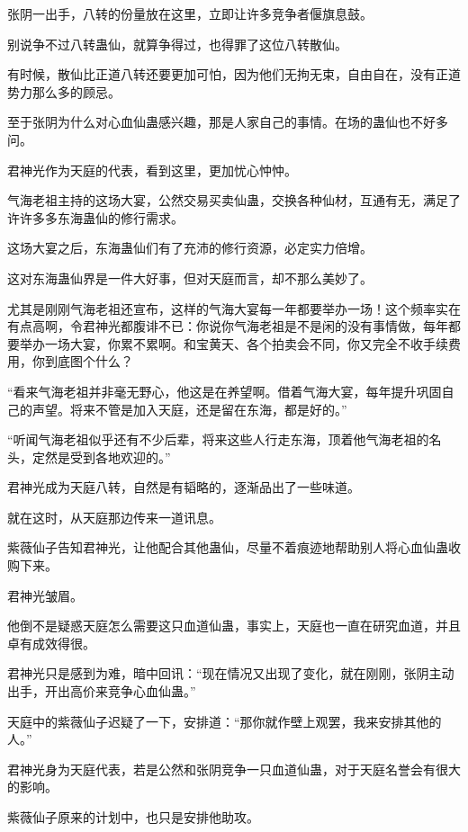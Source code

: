 
\begin{this_body}

张阴一出手，八转的份量放在这里，立即让许多竞争者偃旗息鼓。

别说争不过八转蛊仙，就算争得过，也得罪了这位八转散仙。

有时候，散仙比正道八转还要更加可怕，因为他们无拘无束，自由自在，没有正道势力那么多的顾忌。

至于张阴为什么对心血仙蛊感兴趣，那是人家自己的事情。在场的蛊仙也不好多问。

君神光作为天庭的代表，看到这里，更加忧心忡忡。

气海老祖主持的这场大宴，公然交易买卖仙蛊，交换各种仙材，互通有无，满足了许许多多东海蛊仙的修行需求。

这场大宴之后，东海蛊仙们有了充沛的修行资源，必定实力倍增。

这对东海蛊仙界是一件大好事，但对天庭而言，却不那么美妙了。

尤其是刚刚气海老祖还宣布，这样的气海大宴每一年都要举办一场！这个频率实在有点高啊，令君神光都腹诽不已：你说你气海老祖是不是闲的没有事情做，每年都要举办一场大宴，你累不累啊。和宝黄天、各个拍卖会不同，你又完全不收手续费用，你到底图个什么？

“看来气海老祖并非毫无野心，他这是在养望啊。借着气海大宴，每年提升巩固自己的声望。将来不管是加入天庭，还是留在东海，都是好的。”

“听闻气海老祖似乎还有不少后辈，将来这些人行走东海，顶着他气海老祖的名头，定然是受到各地欢迎的。”

君神光成为天庭八转，自然是有韬略的，逐渐品出了一些味道。

就在这时，从天庭那边传来一道讯息。

紫薇仙子告知君神光，让他配合其他蛊仙，尽量不着痕迹地帮助别人将心血仙蛊收购下来。

君神光皱眉。

他倒不是疑惑天庭怎么需要这只血道仙蛊，事实上，天庭也一直在研究血道，并且卓有成效得很。

君神光只是感到为难，暗中回讯：“现在情况又出现了变化，就在刚刚，张阴主动出手，开出高价来竞争心血仙蛊。”

天庭中的紫薇仙子迟疑了一下，安排道：“那你就作壁上观罢，我来安排其他的人。”

君神光身为天庭代表，若是公然和张阴竞争一只血道仙蛊，对于天庭名誉会有很大的影响。

紫薇仙子原来的计划中，也只是安排他助攻。


\end{this_body}
